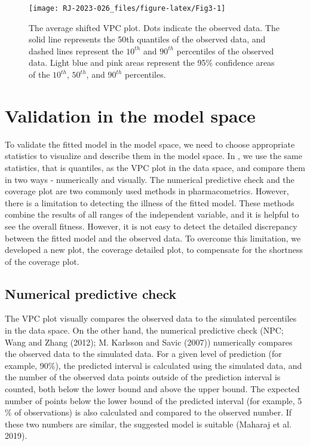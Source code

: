 \begin{figure}
\texttt{[image: RJ-2023-026\_files/figure-latex/Fig3-1]} \caption{The average shifted VPC plot. Dots indicate the observed data. The solid line represents the 50th quantiles of the observed data, and dashed lines represent the $10^{th}$ and $90^{th}$ percentiles of the observed data. Light blue and pink areas represent the 95\% confidence areas of the $10^{th}$, $50^{th}$, and $90^{th}$ percentiles.}\label{fig:Fig3}
\end{figure}

\hypertarget{validation-in-the-model-space}{%
\section{Validation in the model space}\label{validation-in-the-model-space}}

To validate the fitted model in the model space, we need to choose appropriate statistics to visualize and describe them in the model space. In , we use the same statistics, that is quantiles, as the VPC plot in the data space, and compare them in two ways - numerically and visually. The numerical predictive check and the coverage plot are two commonly used methods in pharmacometrics. However, there is a limitation to detecting the illness of the fitted model. These methods combine the results of all ranges of the independent variable, and it is helpful to see the overall fitness. However, it is not easy to detect the detailed discrepancy between the fitted model and the observed data. To overcome this limitation, we developed a new plot, the coverage detailed plot, to compensate for the shortness of the coverage plot.

\hypertarget{numerical-predictive-check}{%
\subsection{Numerical predictive check}\label{numerical-predictive-check}}

The VPC plot visually compares the observed data to the simulated percentiles in the data space. On the other hand, the numerical predictive check (NPC; Wang and Zhang (2012); M. Karlsson and Savic (2007))
numerically compares the observed data to the simulated data. For a given level of prediction (for example, 90\(\%\)), the predicted interval is calculated using the simulated data, and the number of the observed data points outside of the prediction interval is counted, both below the lower bound and above the upper bound. The expected number of points below the lower bound of the predicted interval (for example, 5\(\%\) of observations) is also calculated and compared to the observed number. If these two numbers are similar, the suggested model is suitable (Maharaj et al. 2019).


